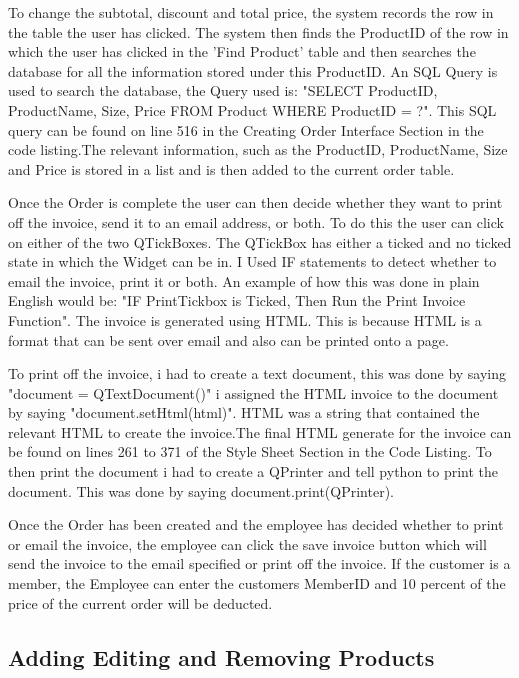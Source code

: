 To change the subtotal, discount and total price, the system records the row in the table the user has clicked. The system then finds the ProductID of the row in which the user has clicked in the 'Find Product' table and then searches the database for all the information stored under this ProductID. An SQL Query is used to search the database, the Query used is: "SELECT ProductID, ProductName, Size, Price FROM Product WHERE ProductID = ?". This SQL query can be found on line 516 in the Creating Order Interface Section in the code listing.The relevant information, such as the ProductID, ProductName, Size and Price is stored in a list and is then added to the current order table. 

Once the Order is complete the user can then decide whether they want to print off the invoice, send it to an email address, or both. To do this the user can click on either of the two QTickBoxes. The QTickBox has either a ticked and no ticked state in which the Widget can be in. I Used IF statements to detect whether to email the invoice, print it or both. An example of how this was done in plain English would be: "IF PrintTickbox is Ticked, Then Run the Print Invoice Function". The invoice is generated using HTML. This is because HTML is a format that can be sent over email and also can be printed onto a page. 

To print off the invoice, i had to create a text document, this was done by saying "document = QTextDocument()" i assigned the HTML invoice to the document by saying "document.setHtml(html)". HTML was a string that contained the relevant HTML to create the invoice.The final HTML generate for the invoice can be found on lines 261 to 371 of the Style Sheet Section in the Code Listing. To then print the document i had to create a QPrinter and tell python to print the document. This was done by saying document.print(QPrinter).

Once the Order has been created and the employee has decided whether to print or email the invoice, the employee can click the save invoice button which will send the invoice to the email specified or print off the invoice. If the customer is a member, the Employee can enter the customers MemberID and 10 percent of the price of the current order will be deducted.

\subsection{Adding Editing and Removing Products}

